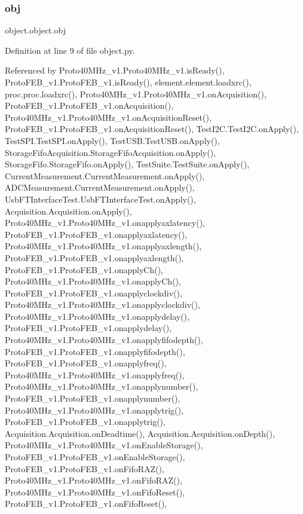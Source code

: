 \subsubsection{\texorpdfstring{obj}{obj}}
{\footnotesize\ttfamily object.\+object.\+obj\hspace{0.3cm}{\ttfamily [inherited]}}



Definition at line 9 of file object.\+py.



Referenced by Proto40\+M\+Hz\+\_\+v1.\+Proto40\+M\+Hz\+\_\+v1.\+is\+Ready(), Proto\+F\+E\+B\+\_\+v1.\+Proto\+F\+E\+B\+\_\+v1.\+is\+Ready(), element.\+element.\+loadxrc(), proc.\+proc.\+loadxrc(), Proto40\+M\+Hz\+\_\+v1.\+Proto40\+M\+Hz\+\_\+v1.\+on\+Acquisition(), Proto\+F\+E\+B\+\_\+v1.\+Proto\+F\+E\+B\+\_\+v1.\+on\+Acquisition(), Proto40\+M\+Hz\+\_\+v1.\+Proto40\+M\+Hz\+\_\+v1.\+on\+Acquisition\+Reset(), Proto\+F\+E\+B\+\_\+v1.\+Proto\+F\+E\+B\+\_\+v1.\+on\+Acquisition\+Reset(), Test\+I2\+C.\+Test\+I2\+C.\+on\+Apply(), Test\+S\+P\+I.\+Test\+S\+P\+I.\+on\+Apply(), Test\+U\+S\+B.\+Test\+U\+S\+B.\+on\+Apply(), Storage\+Fifo\+Acquisition.\+Storage\+Fifo\+Acquisition.\+on\+Apply(), Storage\+Fifo.\+Storage\+Fifo.\+on\+Apply(), Test\+Suite.\+Test\+Suite.\+on\+Apply(), Current\+Measurement.\+Current\+Measurement.\+on\+Apply(), A\+D\+C\+Measurement.\+Current\+Measurement.\+on\+Apply(), Usb\+F\+T\+Interface\+Test.\+Usb\+F\+T\+Interface\+Test.\+on\+Apply(), Acquisition.\+Acquisition.\+on\+Apply(), Proto40\+M\+Hz\+\_\+v1.\+Proto40\+M\+Hz\+\_\+v1.\+onapplyaxlatency(), Proto\+F\+E\+B\+\_\+v1.\+Proto\+F\+E\+B\+\_\+v1.\+onapplyaxlatency(), Proto40\+M\+Hz\+\_\+v1.\+Proto40\+M\+Hz\+\_\+v1.\+onapplyaxlength(), Proto\+F\+E\+B\+\_\+v1.\+Proto\+F\+E\+B\+\_\+v1.\+onapplyaxlength(), Proto\+F\+E\+B\+\_\+v1.\+Proto\+F\+E\+B\+\_\+v1.\+onapply\+Ch(), Proto40\+M\+Hz\+\_\+v1.\+Proto40\+M\+Hz\+\_\+v1.\+onapply\+Ch(), Proto\+F\+E\+B\+\_\+v1.\+Proto\+F\+E\+B\+\_\+v1.\+onapplyclockdiv(), Proto40\+M\+Hz\+\_\+v1.\+Proto40\+M\+Hz\+\_\+v1.\+onapplyclockdiv(), Proto40\+M\+Hz\+\_\+v1.\+Proto40\+M\+Hz\+\_\+v1.\+onapplydelay(), Proto\+F\+E\+B\+\_\+v1.\+Proto\+F\+E\+B\+\_\+v1.\+onapplydelay(), Proto40\+M\+Hz\+\_\+v1.\+Proto40\+M\+Hz\+\_\+v1.\+onapplyfifodepth(), Proto\+F\+E\+B\+\_\+v1.\+Proto\+F\+E\+B\+\_\+v1.\+onapplyfifodepth(), Proto\+F\+E\+B\+\_\+v1.\+Proto\+F\+E\+B\+\_\+v1.\+onapplyfreq(), Proto40\+M\+Hz\+\_\+v1.\+Proto40\+M\+Hz\+\_\+v1.\+onapplyfreq(), Proto40\+M\+Hz\+\_\+v1.\+Proto40\+M\+Hz\+\_\+v1.\+onapplynumber(), Proto\+F\+E\+B\+\_\+v1.\+Proto\+F\+E\+B\+\_\+v1.\+onapplynumber(), Proto40\+M\+Hz\+\_\+v1.\+Proto40\+M\+Hz\+\_\+v1.\+onapplytrig(), Proto\+F\+E\+B\+\_\+v1.\+Proto\+F\+E\+B\+\_\+v1.\+onapplytrig(), Acquisition.\+Acquisition.\+on\+Deadtime(), Acquisition.\+Acquisition.\+on\+Depth(), Proto40\+M\+Hz\+\_\+v1.\+Proto40\+M\+Hz\+\_\+v1.\+on\+Enable\+Storage(), Proto\+F\+E\+B\+\_\+v1.\+Proto\+F\+E\+B\+\_\+v1.\+on\+Enable\+Storage(), Proto\+F\+E\+B\+\_\+v1.\+Proto\+F\+E\+B\+\_\+v1.\+on\+Fifo\+R\+A\+Z(), Proto40\+M\+Hz\+\_\+v1.\+Proto40\+M\+Hz\+\_\+v1.\+on\+Fifo\+R\+A\+Z(), Proto40\+M\+Hz\+\_\+v1.\+Proto40\+M\+Hz\+\_\+v1.\+on\+Fifo\+Reset(), Proto\+F\+E\+B\+\_\+v1.\+Proto\+F\+E\+B\+\_\+v1.\+on\+Fifo\+Reset(), 